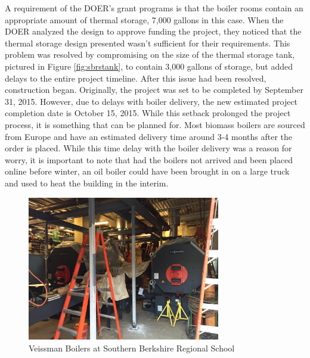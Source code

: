 \par A requirement of the DOER’s grant programs is that the boiler rooms contain an appropriate amount of thermal storage, 7,000 gallons in this case. When the DOER analyzed the design to approve funding the project, they noticed that the thermal storage design presented wasn’t sufficient for their requirements. This problem was resolved by compromising on the size of the thermal storage tank, pictured in Figure \ref{fig:sbrstank}, to contain 3,000 gallons of storage, but added delays to the entire project timeline. After this issue had been resolved, construction began. Originally, the project was set to be completed by September 31, 2015. However, due to delays with boiler delivery, the new estimated project completion date is October 15, 2015. While this setback prolonged the project process, it is something that can be planned for. Most biomass boilers are sourced from Europe and have an estimated delivery time around 3-4 months after the order is placed. While this time delay with the boiler delivery was a reason for worry, it is important to note that had the boilers not arrived and been placed online before winter, an oil boiler could have been brought in on a large truck and used to heat the building in the interim.
\begin{figure}[H]
\centering
\includegraphics[width=0.75\textwidth]{findingschapter/southernberkshireboilers}
\caption{Veissman Boilers at Southern Berkshire Regional School}
\label{fig:sbrsboilers}
\end{figure}


